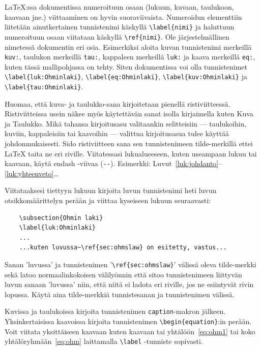 \documentclass[finnish, 12pt, a4paper, arts, utf8, a-2b, online]{aaltothesis}
\begin{document}
\LaTeX{}:ssa dokumentissa numeroituun osaan (lukuun, kuvaan, taulukoon, 
kaavaan jne.) viittaaminen on hyvin suoraviivaista. Numeroidun elementtiin 
liitetään ainutkertainen tunnistenimi käskyllä \verb+\label{nimi}+ ja haluttuun 
numeroituun osaan viitataan käskyllä \verb+\ref{nimi}+. Ole järjestelmällinen 
nimetessä dokumentin eri osia. Esimerkiksi aloita kuvan tunnistenimi merkeillä 
\texttt{kuv:}, taulukon merkeillä \texttt{tau:}, kappaleen merkeillä 
\texttt{luk:} ja kaava merkeillä \texttt{eq:}, kuten tässä mallipohjassa on 
tehty. Siten dokumentissa voi olla tunnistenimet \verb+\label{luk:Ohminlaki}+, 
\verb+\label{eq:Ohminlaki}+, \verb+\label{kuv:Ohminlaki}+ ja 
\verb+\label{tau:Ohminlaki}+.

Huomaa, että kuva- ja taulukko-sana kirjoitetaan pienellä ristiviitteessä. 
Ristiviitteissa usein näkee myös käytettävän sanat isolla kirjaimella kuten 
Kuva ja Taulukko. Mikä tahansa kirjoitusasu valitaankin selitteisiin --- 
taulukoihin, kuviin, kappaleisiin tai kaavoihin --- valittua kirjoitusasua 
tulee käyttää johdonmukaisesti. Sido ristiviitteen sana sen tunnistenimeen 
tilde-merkillä ettei \LaTeX{} taita ne eri riville. Viitatessasi lukualueeseen, 
kuten useampaan lukuu tai kaavaan, käytä endash -viivaa (\verb+--+). Esimerkki: 
Luvut~\ref{luk:johdanto}--\ref{luk:yhteenveto}\ldots

Viitataaksesi tiettyyn lukuun kirjoita luvun tunnistenimi heti luvun 
otsikkomäärittelyn perään ja viittaa kyseiseen lukuun seuraavasti:
\begin{verbatim}
	\subsection{Ohmin laki}
	\label{luk:Ohminlaki}
	...
	...kuten luvussa~\ref{sec:ohmslaw} on esitetty, vastus...
\end{verbatim}
Sanan 'luvussa' ja tunnistenimen '\verb+\ref{sec:ohmslaw}+' välissä oleva 
tilde-merkki sekä latoo normaalinkokoisen välilyönnin että sitoo tunnistenimeen 
liittyvän luvun sanaan 'luvussa' niin, että niitä ei ladota eri riville, jos ne 
esiintyvät rivin lopussa. Käytä aina tilde-merkkiä tunnistesanan ja 
tunnistenimen välissä.

Kuvissa ja taulukoissa kirjoita tunnistenimen \verb+caption+-makron jälkeen. 
Yksinkertaisissa kaavoissa kirjoita tunnistenimen \verb+\begin{equation}+:in
perään. Voit viitata yksittäiseen kaavaan kuten kaavaan tai 
yhtälöön~\ref{eq:ohm1} tai koko yhtälöryhmään~\ref{eq:ohm} laittamalla 
\verb+\label+ -tunniste sopivasti.
\end{document}
